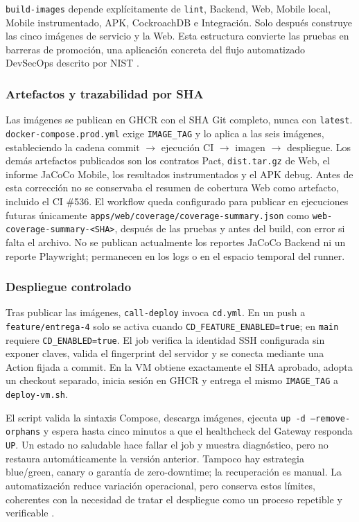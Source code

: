 \texttt{build-images} depende explícitamente de \texttt{lint}, Backend, Web,
Mobile local, Mobile instrumentado, APK, CockroachDB e Integración. Solo después
construye las cinco imágenes de servicio y la Web. Esta estructura convierte las
pruebas en barreras de promoción, una aplicación concreta del flujo automatizado
DevSecOps descrito por NIST \cite{chandramouli2022nistdevsecops}.

\subsubsection{Artefactos y trazabilidad por SHA}

Las imágenes se publican en GHCR con el SHA Git completo, nunca con
\texttt{latest}. \texttt{docker-compose.prod.yml} exige \texttt{IMAGE\_TAG} y lo
aplica a las seis imágenes, estableciendo la cadena
commit $\rightarrow$ ejecución CI $\rightarrow$ imagen $\rightarrow$ despliegue.
Los demás artefactos publicados son los contratos Pact, \texttt{dist.tar.gz} de
Web, el informe JaCoCo Mobile, los resultados instrumentados y el APK debug.
Antes de esta corrección no se conservaba el resumen de cobertura Web como
artefacto, incluido el CI \#536. El workflow queda configurado para publicar en
ejecuciones futuras únicamente \texttt{apps/web/coverage/coverage-summary.json}
como \texttt{web-coverage-summary-<SHA>}, después de las pruebas y antes del
build, con error si falta el archivo. No se publican actualmente los reportes
JaCoCo Backend ni un reporte Playwright; permanecen en los logs o en el espacio
temporal del runner.

\subsubsection{Despliegue controlado}

Tras publicar las imágenes, \texttt{call-deploy} invoca \texttt{cd.yml}. En un
push a \texttt{feature/entrega-4} solo se activa cuando
\texttt{CD\_FEATURE\_ENABLED=true}; en \texttt{main} requiere
\texttt{CD\_ENABLED=true}. El job verifica la identidad SSH configurada sin
exponer claves, valida el fingerprint del servidor y se conecta mediante una
Action fijada a commit. En la VM obtiene exactamente el SHA aprobado, adopta un
checkout separado, inicia sesión en GHCR y entrega el mismo \texttt{IMAGE\_TAG} a
\texttt{deploy-vm.sh}.

El script valida la sintaxis Compose, descarga imágenes, ejecuta
\texttt{up -d --remove-orphans} y espera hasta cinco minutos a que el healthcheck
del Gateway responda \texttt{UP}. Un estado no saludable hace fallar el job y
muestra diagnóstico, pero no restaura automáticamente la versión anterior. Tampoco
hay estrategia blue/green, canary o garantía de zero-downtime; la recuperación
es manual. La automatización reduce variación operacional, pero conserva estos
límites, coherentes con la necesidad de tratar el despliegue como un proceso
repetible y verificable \cite{farley2021modernsoftwareengineering}.

